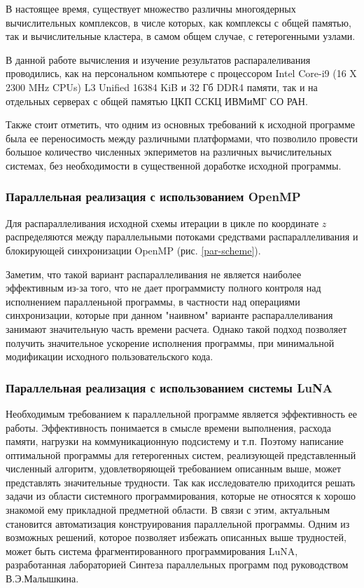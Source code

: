 В настоящее время, существует множество различны многоядерных вычислительных комплексов, в числе которых, как комплексы с общей памятью,
так и вычислительные кластера, в самом общем случае, с гетерогенными узлами.

В данной работе вычисления и изучение результатов распаралеливания проводились,
как на персональном компьютере с процессором Intel Core-i9 (16 X 2300 MHz CPUs) L3 Unified 16384 KiB и
32 Гб DDR4 памяти, так и на отдельных серверах с общей памятью ЦКП ССКЦ ИВМиМГ СО РАН.

Также стоит отметить, что одним из основных требований к исходной программе была ее переносимость между различными платформами,
что позволило провести большое количество численных экпериметов на различных вычислительных системах,
без необходимости в существенной доработке исходной программы.

\subsubsection{Параллельная реализация с использованием OpenMP}

Для распараллеливания исходной схемы итерации в цикле по координате $z$ распределяются между параллельными потоками средствами распараллеливания и блокирующей синхронизации OpenMP (рис. \ref{par-scheme}).

Заметим, что такой вариант распараллеливания не является наиболее эффективным из-за того, что не дает программисту полного контроля
над исполнением паралленьной программы, в частности над операциями синхронизации, которые при данном "наивном" варианте распараллеливания
занимают значительную часть времени расчета. Однако такой подход позволяет получить значительное ускорение исполнения программы,
при минимальной модификации исходного пользовательского кода.


\subsubsection{Параллельная реализация с использованием системы LuNA}

Необходимым требованием к параллельной программе является эффективность ее работы. Эффективность понимается в смысле времени выполнения,
расхода памяти, нагрузки на коммуникационную подсистему и т.п.
Поэтому написание оптимальной программы для гетерогенных систем, реализующей представленный численный алгоритм,
удовлетворяющей требованием описанным выше, может представлять значительные трудности.
Так как исследователю приходится решать задачи из области системного программирования,
которые не относятся к хорошо знакомой ему прикладной предметной области.
В связи с этим, актуальным становится автоматизация конструирования параллельной программы.
Одним из возможных решений, которое позволяет избежать описанных выше трудностей, может быть система фрагментированного программирования LuNA,
разработанная лабораторией Синтеза параллельных программ под руководством В.Э.Малышкина.

